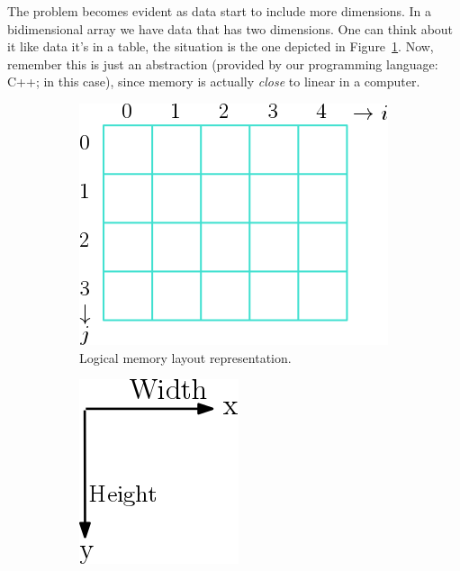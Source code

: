 The problem becomes evident as data start to include more dimensions. 
In a bidimensional array we have data that has two dimensions.
One can think about it like data it's in a table, the situation is the one depicted in Figure~\ref{fig:2a}. 
Now, remember this is just an abstraction (provided by our programming language: C++; in this case), since memory is actually \emph{close} to linear in a computer.

\begin{figure}[htp]
  \centering
  \begin{subfigure}[b]{0.35\textwidth}
    \includegraphics[width=\textwidth]{img/array2D}
    \caption{Logical memory layout representation.}
  \label{fig:2a}
  \end{subfigure}
  \hspace*{4cm}
  \begin{subfigure}[b]{0.25\textwidth}
    \includegraphics[width=\textwidth]{img/arrow2D}

\end{subfigure}
\end{figure}
